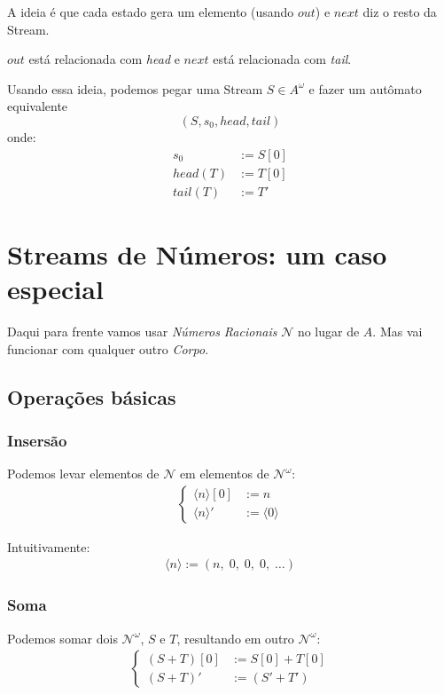 \documentclass{article}
\newcommand{\head}{\emph{head}}
\newcommand{\tail}{\emph{tail}}
\newcommand{\Num}{\mathcal{N}}
\newcommand{\ins}[1]{\langle #1 \rangle}
\begin{document}
A ideia é que cada estado
gera um elemento (usando \(out\)) e
\(next\) diz o resto da Stream.

\(out\) está relacionada com \head{} e
\(next\) está relacionada com \tail{}.

Usando essa ideia,
podemos pegar uma Stream
\(S \in A^\omega\) e
fazer um autômato equivalente
\[
    (S, s_0, head, tail)
\]
onde:
\begin{align*}
    s_0     &:= S[0] \\
    head(T) &:= T[0] \\
    tail(T) &:= T'
\end{align*}

\section{Streams de Números: um caso especial}

Daqui para frente vamos usar \emph{Números Racionais}
\(\Num\) no lugar de \(A\).
Mas vai funcionar com qualquer outro \emph{Corpo}.

\subsection{Operações básicas}

\subsubsection{Insersão}

Podemos levar elementos de \(\Num\)
em elementos de \(\Num^\omega\):
\begin{align*} \begin{cases}
    \ins{n}[0] &:= n \\
    \ins{n}'   &:= \ins{0}
\end{cases} \end{align*}

Intuitivamente:
\begin{align*}
    \ins{n} := (n, \; 0, \; 0, \; 0, \; \dots)
\end{align*}

\subsubsection{Soma}

Podemos somar dois \(\Num^\omega\),
\(S\) e \(T\),
resultando em outro \(\Num^\omega\):
\begin{align*} \begin{cases}
    (S + T)[0] &:= S[0] + T[0] \\
    (S + T)'   &:= (S' + T')
\end{cases} \end{align*}
\end{document}
